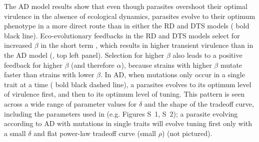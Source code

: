 The AD model results show that even though parasites overshoot their optimal virulence in the absence of ecological dynamics, parasites evolve to their optimum phenotype in a more direct route than in either the RD and DTS models ( bold black line). Eco-evolutionary feedbacks in the RD and DTS models select for increased $\beta$ in the short term \citep{DayandProulx2004, Bolkeretal.2010}, which results in higher transient virulence than in the AD model (, top left panel). Selection for higher $\beta$ also leads to a positive feedback for higher $\beta$ (and therefore $\alpha$), because strains with higher $\beta$ mutate faster than strains with lower $\beta$. In AD, when mutations only occur in a single trait at a time ( bold black dashed line), a parasites evolves to its optimum level of virulence first, and then to its optimum level of tuning. This pattern is seen across a wide range of parameter values for $\delta$ and the shape of the tradeoff curve, including the parameters used in  (e.g. Figures S~1, S~2); a parasite evolving according to AD with mutations in single traits will evolve tuning first only with a small $\delta$ and flat power-law tradeoff curve (small $\rho$) (not pictured).


